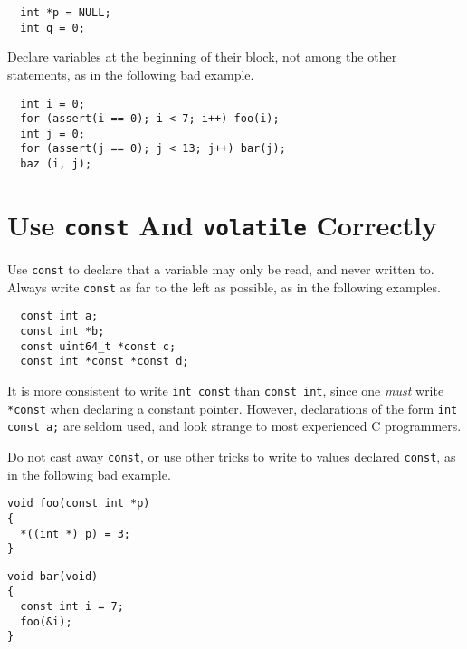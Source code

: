 \documentclass{lulu}
\newcommand{\code}[1]{\texttt{#1}\xspace}
\begin{document}
\begin{samepage}
\begin{verbatim}
  int *p = NULL;
  int q = 0;
\end{verbatim}
\end{samepage}

Declare variables at the beginning of their block, not among the other
statements, as in the following bad example.

\begin{samepage}
\begin{verbatim}
  int i = 0;
  for (assert(i == 0); i < 7; i++) foo(i);
  int j = 0;
  for (assert(j == 0); j < 13; j++) bar(j);
  baz (i, j);
\end{verbatim}
\end{samepage}

\section{Use \code{const} And \code{volatile} Correctly}

Use \code{const} to declare that a variable may only be read, and
never written to.  Always write \code{const} as far to the left as
possible, as in the following examples.

\begin{samepage}
\begin{verbatim}
  const int a;
  const int *b;
  const uint64_t *const c;
  const int *const *const d;
\end{verbatim}
\end{samepage}

It is more consistent to write \code{int const} than \code{const int},
since one \emph{must} write \code{*const} when declaring a constant
pointer.  However, declarations of the form \code{int const a;} are
seldom used, and look strange to most experienced C programmers.

Do not cast away \code{const}, or use other tricks to write to values
declared \code{const}, as in the following bad example.

\begin{samepage}
\begin{verbatim}
void foo(const int *p)
{
  *((int *) p) = 3;
}
\end{verbatim}
\end{samepage}

\begin{samepage}
\begin{verbatim}
void bar(void)
{
  const int i = 7;
  foo(&i);
}
\end{verbatim}
\end{samepage}
\end{document}
